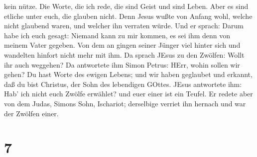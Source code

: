 kein nütze. Die Worte, die ich rede, die sind Geist und sind Leben.
 Aber es sind etliche unter euch, die glauben nicht. Denn
Jesus wußte von Anfang wohl, welche nicht glaubend waren, und welcher
ihn verraten würde.  Und er sprach: Darum habe ich euch
gesagt: Niemand kann zu mir kommen, es sei ihm denn von meinem Vater
gegeben.  Von dem an gingen seiner Jünger viel hinter sich
und wandelten hinfort nicht mehr mit ihm.  Da sprach JEsus
zu den Zwölfen: Wollt ihr auch weggehen?  Da antwortete ihm
Simon Petrus: HErr, wohin sollen wir gehen? Du hast Worte des ewigen
Lebens;  und wir haben geglaubet und erkannt, daß du bist
Christus, der Sohn des lebendigen GOttes.  JEsus antwortete
ihm: Hab' ich nicht euch Zwölfe erwählet? und euer einer ist ein Teufel.
 Er redete aber von dem Judas, Simons Sohn, Ischariot;
derselbige verriet ihn hernach und war der Zwölfen einer.

\hypertarget{section-6}{%
\section{7}\label{section-6}}

